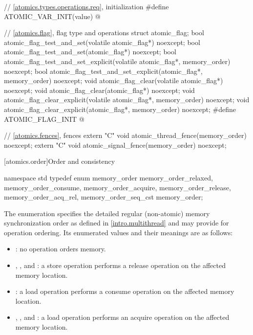 \begin{codeblock}
{  // \ref{atomics.types.operations.req}, initialization
  #define ATOMIC_VAR_INIT(value) @\seebelow@

  // \ref{atomics.flag}, flag type and operations
  struct atomic_flag;
  bool atomic_flag_test_and_set(volatile atomic_flag*) noexcept;
  bool atomic_flag_test_and_set(atomic_flag*) noexcept;
  bool atomic_flag_test_and_set_explicit(volatile atomic_flag*, memory_order) noexcept;
  bool atomic_flag_test_and_set_explicit(atomic_flag*, memory_order) noexcept;
  void atomic_flag_clear(volatile atomic_flag*) noexcept;
  void atomic_flag_clear(atomic_flag*) noexcept;
  void atomic_flag_clear_explicit(volatile atomic_flag*, memory_order) noexcept;
  void atomic_flag_clear_explicit(atomic_flag*, memory_order) noexcept;
  #define ATOMIC_FLAG_INIT @\seebelow@

  // \ref{atomics.fences}, fences
  extern "C" void atomic_thread_fence(memory_order) noexcept;
  extern "C" void atomic_signal_fence(memory_order) noexcept;
}
\end{codeblock}

[atomics.order]{Order and consistency}

\begin{codeblock}
namespace std {
  typedef enum memory_order {
    memory_order_relaxed, memory_order_consume, memory_order_acquire,
    memory_order_release, memory_order_acq_rel, memory_order_seq_cst
  } memory_order;
}
\end{codeblock}

\pnum
The enumeration  specifies the detailed regular
(non-atomic) memory synchronization order as defined in
\ref{intro.multithread} and may provide for operation ordering. Its
enumerated values and their meanings are as follows:

\begin{itemize}
\item {}: no operation orders memory.

\item {}, , and
: a store operation performs a release operation on the
affected memory location.

\item {}: a load operation performs a consume operation on the
affected memory location.

\item {}, , and
: a load operation performs an acquire operation on the
affected memory location.
\end{itemize}


